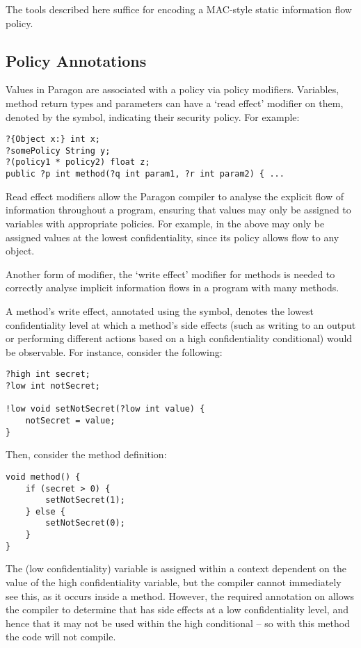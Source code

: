 The tools described here suffice for encoding a MAC-style static information flow policy.

\subsection{Policy Annotations}

Values in Paragon are associated with a policy via policy modifiers. Variables, method return types and parameters can have a `read effect' modifier on them, denoted by the  symbol, indicating their security policy. For example:

\begin{verbatim}
?{Object x:} int x;
?somePolicy String y;
?(policy1 * policy2) float z;
public ?p int method(?q int param1, ?r int param2) { ...
\end{verbatim}

Read effect modifiers allow the Paragon compiler to analyse the explicit flow of information throughout a program, ensuring that values may only be assigned to variables with appropriate policies. For example, in the above  may only be assigned values at the lowest confidentiality, since its policy allows flow to any object. 

Another form of modifier, the `write effect' modifier for methods is needed to correctly analyse implicit information flows in a program with many methods.

A method's write effect, annotated using the \mono{!} symbol, denotes the lowest confidentiality level at which a method's side effects (such as writing to an output or performing different actions based on a high confidentiality conditional) would be observable. For instance, consider the following:

\begin{verbatim}
?high int secret;
?low int notSecret;

!low void setNotSecret(?low int value) {
	notSecret = value;
}
\end{verbatim}

Then, consider the method definition:

\begin{verbatim}
void method() {
	if (secret > 0) {
		setNotSecret(1);
	} else {
		setNotSecret(0);
	}
}
\end{verbatim}

The (low confidentiality)  variable is assigned within a context dependent on the value of the high confidentiality  variable, but the compiler cannot immediately see this, as it occurs inside a method. However, the required  annotation on  allows the compiler to determine that  has side effects at a low confidentiality level, and hence that it may not be used within the high conditional -- so with this method the code will not compile.

